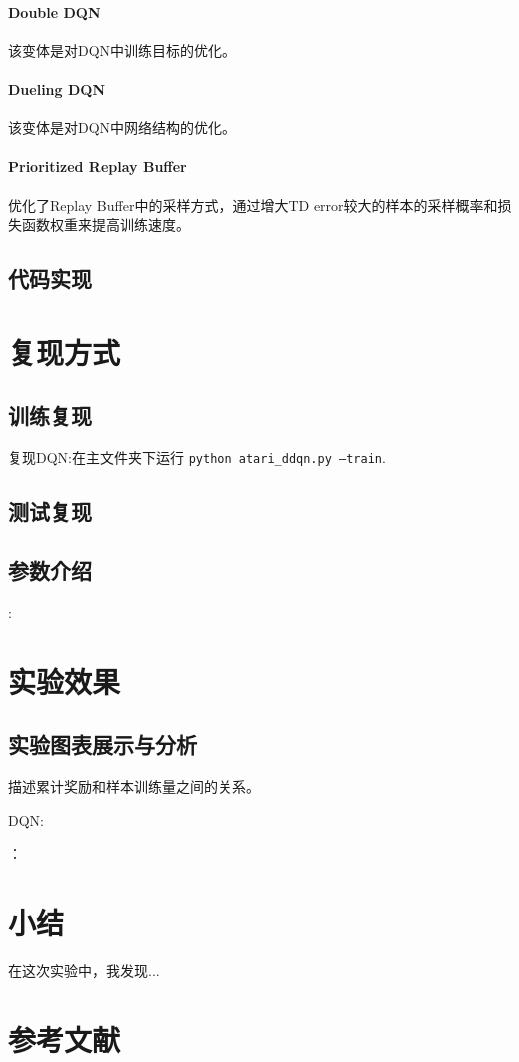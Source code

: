 \documentclass[a4paper,12pt]{article}
\begin{document}
\begin{CJK}{UTF8}{gbsn}
\paragraph{Double DQN} 该变体是对DQN中训练目标的优化。
\paragraph{Dueling DQN} 该变体是对DQN中网络结构的优化。
\paragraph{Prioritized Replay Buffer} 优化了Replay Buffer中的采样方式，通过增大TD error较大的样本的采样概率和损失函数权重来提高训练速度。
\subsection{代码实现}
\section{复现方式}
\subsection{训练复现}
复现DQN:在主文件夹下运行 \texttt{python atari\_ddqn.py --train}.
\subsection{测试复现}
\subsection{参数介绍}
:
\section{实验效果}
\subsection{实验图表展示与分析}
描述累计奖励和样本训练量之间的关系。

\noindent DQN:

：

\section{小结}
在这次实验中，我发现...


\section{参考文献}

\end{CJK}
\end{document}

